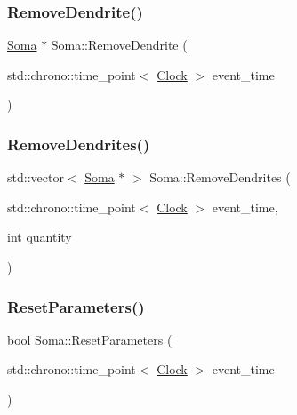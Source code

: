 \mbox{\label{classSoma_a85c7d4b41486182c9528f5c43beaf7fd}} 
\subsubsection{\texorpdfstring{Remove\+Dendrite()}{RemoveDendrite()}}
{\footnotesize\ttfamily \mbox{\hyperlink{classSoma}{Soma}} $\ast$ Soma\+::\+Remove\+Dendrite (\begin{DoxyParamCaption}\item[{std\+::chrono\+::time\+\_\+point$<$ \mbox{\hyperlink{universe_8h_a0ef8d951d1ca5ab3cfaf7ab4c7a6fd80}{Clock}} $>$}]{event\+\_\+time }\end{DoxyParamCaption})}

\mbox{\label{classSoma_ad15baed4b2f5dab6f93e5df8fd1f7b23}} 
\subsubsection{\texorpdfstring{Remove\+Dendrites()}{RemoveDendrites()}}
{\footnotesize\ttfamily std\+::vector$<$ \mbox{\hyperlink{classSoma}{Soma}} $\ast$ $>$ Soma\+::\+Remove\+Dendrites (\begin{DoxyParamCaption}\item[{std\+::chrono\+::time\+\_\+point$<$ \mbox{\hyperlink{universe_8h_a0ef8d951d1ca5ab3cfaf7ab4c7a6fd80}{Clock}} $>$}]{event\+\_\+time,  }\item[{int}]{quantity }\end{DoxyParamCaption})}

\mbox{\label{classSoma_a82f016dc126f7d1053e5eb455d28c44b}} 
\subsubsection{\texorpdfstring{Reset\+Parameters()}{ResetParameters()}}
{\footnotesize\ttfamily bool Soma\+::\+Reset\+Parameters (\begin{DoxyParamCaption}\item[{std\+::chrono\+::time\+\_\+point$<$ \mbox{\hyperlink{universe_8h_a0ef8d951d1ca5ab3cfaf7ab4c7a6fd80}{Clock}} $>$}]{event\+\_\+time }\end{DoxyParamCaption})}

